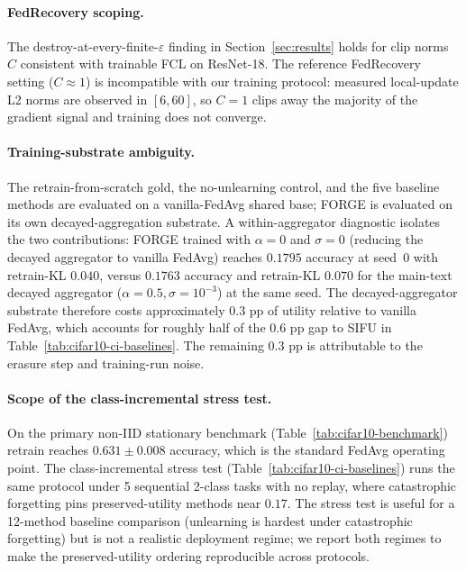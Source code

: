 \paragraph{FedRecovery scoping.}
The destroy-at-every-finite-$\varepsilon$ finding in Section~\ref{sec:results} holds
for clip norms $C$ consistent with trainable FCL on ResNet-18. The reference
FedRecovery setting ($C \approx 1$) is incompatible with our training protocol:
measured local-update L2 norms are observed in $[6, 60]$, so $C = 1$ clips away the
majority of the gradient signal and training does not converge.

\paragraph{Training-substrate ambiguity.}
The retrain-from-scratch gold, the no-unlearning control, and the five baseline
methods are evaluated on a vanilla-FedAvg shared base; FORGE is evaluated on its own
decayed-aggregation substrate. A within-aggregator diagnostic isolates the two
contributions: FORGE trained with $\alpha{=}0$ and $\sigma{=}0$ (reducing the
decayed aggregator to vanilla FedAvg) reaches $0.1795$ accuracy at seed~$0$ with
retrain-KL $0.040$, versus $0.1763$ accuracy and retrain-KL $0.070$ for the main-text
decayed aggregator ($\alpha{=}0.5, \sigma{=}10^{-3}$) at the same seed. The
decayed-aggregator substrate therefore costs approximately $0.3$ pp of utility
relative to vanilla FedAvg, which accounts for roughly half of the $0.6$ pp gap to
SIFU in Table~\ref{tab:cifar10-ci-baselines}. The remaining $0.3$ pp is attributable to
the erasure step and training-run noise.

\paragraph{Scope of the class-incremental stress test.}
On the primary non-IID stationary benchmark (Table~\ref{tab:cifar10-benchmark})
retrain reaches $0.631 \pm 0.008$ accuracy, which is the standard FedAvg
operating point. The class-incremental stress test
(Table~\ref{tab:cifar10-ci-baselines}) runs the same protocol under 5 sequential
2-class tasks with no replay, where catastrophic forgetting pins preserved-utility
methods near $0.17$. The stress test is useful for a 12-method baseline
comparison (unlearning is hardest under catastrophic forgetting) but is not a
realistic deployment regime; we report both regimes to make the preserved-utility
ordering reproducible across protocols.

